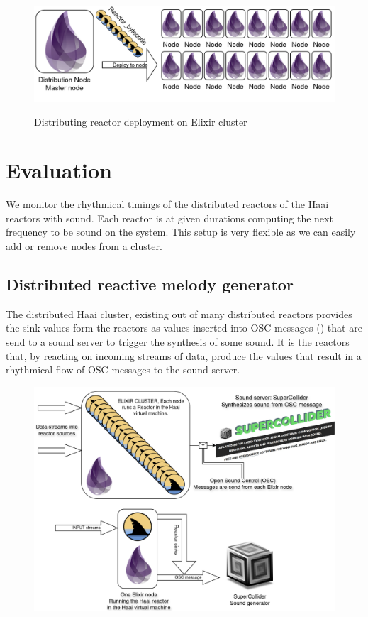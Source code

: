 \documentclass[a4paper]{book}
\begin{document}
\begin{figure}[h]
	\caption{Distributing reactor deployment on Elixir cluster}
	\includegraphics[width=\textwidth]{distribution300.drawio}
	\label{fig:rdi}
\end{figure}  

\chapter{Evaluation}

We monitor the rhythmical timings of the distributed reactors of the Haai reactors with sound. Each reactor is at given durations computing the next frequency to be sound on the system. This setup is very flexible as we can easily add or remove nodes from a cluster.   

\section{Distributed reactive melody generator}
The distributed Haai cluster, existing out of many distributed reactors provides the sink values form the reactors as values inserted into OSC messages (\cite{schmeder2010best}) that are send to a sound server to trigger the synthesis of some sound. It is the reactors that, by reacting on incoming streams of data, produce the values that result in a rhythmical flow of OSC messages to the sound server. 

\begin{figure}[h]
	\includegraphics[width=\textwidth]{drmg200.drawio}
	\label{fig:drmg}
\end{figure}
 
\end{document}
